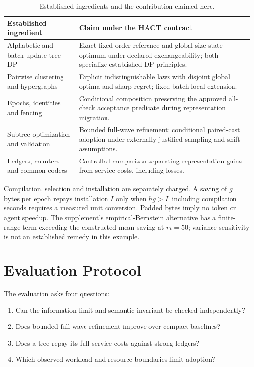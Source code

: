\documentclass[10pt,journal,compsoc]{IEEEtran}
\theoremstyle{definition}\newtheorem{definition}[theorem]{Definition}
\begin{document}
\begin{table}[t]\centering\footnotesize
\caption{Established ingredients and the contribution claimed here.}
\label{tab:novelty}
\begin{tabularx}{\columnwidth}{@{}p{}X@{}}\toprule
Established ingredient & Claim under the HACT contract\\\midrule
Alphabetic and batch-update tree DP & Exact fixed-order reference and global size-state optimum under declared exchangeability; both specialize established DP principles.\\
Pairwise clustering and hypergraphs & Explicit indistinguishable laws with disjoint global optima and sharp regret; fixed-batch local extension.\\
Epochs, identities and fencing & Conditional composition preserving the approved all-check acceptance predicate during representation migration.\\
Subtree optimization and validation & Bounded full-wave refinement; conditional paired-cost adoption under externally justified sampling and shift assumptions.\\
Ledgers, counters and common codecs & Controlled comparison separating representation gains from service costs, including losses.\\\bottomrule
\end{tabularx}
\end{table}

Compilation, selection and installation are separately charged. A saving
of $g$ bytes per epoch repays installation $I$ only when $h g>I$; including
compilation seconds requires a measured unit conversion. Padded bytes imply
no token or agent speedup. The supplement's empirical-Bernstein alternative
has a finite-range term exceeding the constructed mean saving at $m=50$;
variance sensitivity is not an established remedy in this example.

\section{Evaluation Protocol}\label{sec:jevaluation}
The evaluation asks four questions:
\begin{enumerate}
\item Can the information limit and semantic invariant be checked independently?
\item Does bounded full-wave refinement improve over compact baselines?
\item Does a tree repay its full service costs against strong ledgers?
\item Which observed workload and resource boundaries limit adoption?
\end{enumerate}
\end{document}
